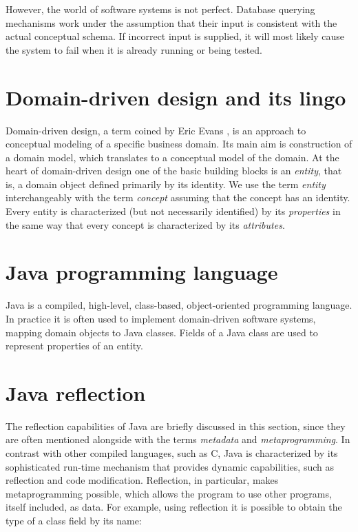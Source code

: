 \n

However, the world of software systems is not perfect. Database querying mechanisms work under the assumption that their input is consistent with the actual conceptual schema. If incorrect input is supplied, it will most likely cause the system to fail when it is already running or being tested.

\section{Domain-driven design and its lingo}
Domain-driven design, a term coined by Eric Evans \cite{ddd}, is an approach to conceptual modeling of a specific business domain.
Its main aim is construction of a domain model, which translates to a conceptual model of the domain.
At the heart of domain-driven design one of the basic building blocks is an \textit{entity}, that is, a domain object defined primarily by its identity.
We use the term \textit{entity} interchangeably with the term \textit{concept} assuming that the concept has an identity. 
Every entity is characterized (but not necessarily identified) by its \textit{properties} in the same way that every concept is characterized by its \textit{attributes}.

\section{Java programming language}
Java is a compiled, high-level, class-based, object-oriented programming language.
In practice it is often used to implement domain-driven software systems, mapping domain objects to Java classes.
Fields of a Java class are used to represent properties of an entity.

\section{Java reflection}
The reflection capabilities of Java are briefly discussed in this section, since they are often mentioned alongside with the terms \textit{metadata} and \textit{metaprogramming}.
In contrast with other compiled languages, such as C, Java is characterized by its sophisticated run-time mechanism that provides dynamic capabilities, such as reflection and code modification.
Reflection, in particular, makes metaprogramming possible, which allows the program to use other programs, itself included, as data.
For example, using reflection it is possible to obtain the type of a class field by its name:

